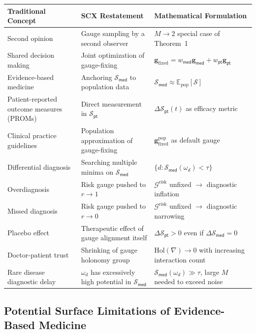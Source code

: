 \documentclass[12pt,a4paper]{article}
\theoremstyle{remark}
\newcommand{\G}{\mathcal{G}}
\newcommand{\med}{\textsf{med}}
\newcommand{\pt}{\textsf{pt}}
\begin{document}
\begin{center}
\begin{tabular}{p{3.5cm} p{4cm} p{6cm}}
\toprule
\textbf{Traditional Concept} & \textbf{SCX Restatement} & \textbf{Mathematical Formulation} \\
\midrule
Second opinion & Gauge sampling by a second observer & $M \to 2$ special case of Theorem~1 \\
\addlinespace
Shared decision making & Joint optimization of gauge-fixing & $\mathbf{g}_{\text{fixed}} = w_{\med}\mathbf{g}_{\med} + w_{\pt}\mathbf{g}_{\pt}$ \\
\addlinespace
Evidence-based medicine & Anchoring $\mathcal{S}_{\med}$ to population data & $\mathcal{S}_{\med} \approx \mathbb{E}_{\text{pop}}[\mathcal{S}]$ \\
\addlinespace
Patient-reported outcome measures (PROMs) & Direct measurement in $\mathcal{S}_{\pt}$ & $\Delta\mathcal{S}_{\pt}(t)$ as efficacy metric \\
\addlinespace
Clinical practice guidelines & Population approximation of gauge-fixing & $\mathbf{g}_{\text{fixed}}^{\text{pop}}$ as default gauge \\
\addlinespace
Differential diagnosis & Searching multiple minima on $\mathcal{S}_{\med}$ & $\{d: \mathcal{S}_{\med}(\omega_d) < \tau\}$ \\
\addlinespace
Overdiagnosis & Risk gauge pushed to $r \to 1$ & $\G^{\text{risk}}$ unfixed $\to$ diagnostic inflation \\
\addlinespace
Missed diagnosis & Risk gauge pushed to $r \to 0$ & $\G^{\text{risk}}$ unfixed $\to$ diagnostic narrowing \\
\addlinespace
Placebo effect & Therapeutic effect of gauge alignment itself & $\Delta\mathcal{S}_{\pt} > 0$ even if $\Delta\mathcal{S}_{\med} = 0$ \\
\addlinespace
Doctor-patient trust & Shrinking of gauge holonomy group & $\text{Hol}(\nabla) \to 0$ with increasing interaction count \\
\addlinespace
Rare disease diagnostic delay & $\omega_d$ has excessively high potential in $\mathcal{S}_{\med}$ & $\mathcal{S}_{\med}(\omega_d) \gg \tau$, large $M$ needed to exceed noise \\
\bottomrule
\end{tabular}
\end{center}

\subsection{Potential Surface Limitations of Evidence-Based Medicine}
\end{document}
